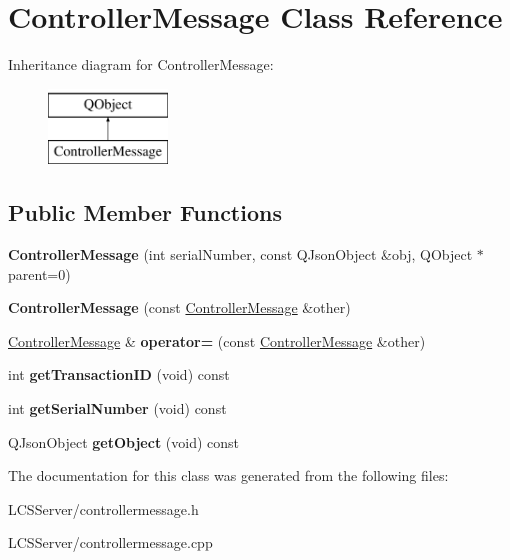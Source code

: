 \hypertarget{class_controller_message}{}\section{Controller\+Message Class Reference}
\label{class_controller_message}
Inheritance diagram for Controller\+Message\+:\begin{figure}[H]
\begin{center}
\leavevmode
\includegraphics[height=2.000000cm]{class_controller_message}
\end{center}
\end{figure}
\subsection*{Public Member Functions}
\begin{DoxyCompactItemize}
\item 
\mbox{\label{class_controller_message_a001cfe43b7b43f98c8082d6a4deb83b9}} 
{\bfseries Controller\+Message} (int serial\+Number, const Q\+Json\+Object \&obj, Q\+Object $\ast$parent=0)
\item 
\mbox{\label{class_controller_message_a8507bce7f49eafb7e76ed1baef82c550}} 
{\bfseries Controller\+Message} (const \hyperlink{class_controller_message}{Controller\+Message} \&other)
\item 
\mbox{\label{class_controller_message_ada26e02e79c474c6a348bbd84a865135}} 
\hyperlink{class_controller_message}{Controller\+Message} \& {\bfseries operator=} (const \hyperlink{class_controller_message}{Controller\+Message} \&other)
\item 
\mbox{\label{class_controller_message_a3db2366829d7837298b7a903998c0253}} 
int {\bfseries get\+Transaction\+ID} (void) const
\item 
\mbox{\label{class_controller_message_af68860e095bc84883064fada63994c3c}} 
int {\bfseries get\+Serial\+Number} (void) const
\item 
\mbox{\label{class_controller_message_aef506f77c5a417938bb4342e6ec8591a}} 
Q\+Json\+Object {\bfseries get\+Object} (void) const
\end{DoxyCompactItemize}


The documentation for this class was generated from the following files\+:\begin{DoxyCompactItemize}
\item 
L\+C\+S\+Server/controllermessage.\+h\item 
L\+C\+S\+Server/controllermessage.\+cpp\end{DoxyCompactItemize}
